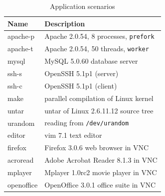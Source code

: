 \begin{table}[t]
\begin{center}
\small
\begin{tabular}{|l|l|}   \hline
\bf{Name}  & \bf{Description}                           \\ \hline
apache-p   & Apache 2.0.54, 8 processes, {\tt prefork}  \\ \hline
apache-t   & Apache 2.0.54, 50 threads, {\tt worker}    \\ \hline
mysql      & MySQL 5.0.60 database server               \\ \hline
ssh-s      & OpenSSH 5.1p1 (server)                     \\ \hline
ssh-c      & OpenSSH 5.1p1 (client)                     \\ \hline
make       & parallel compilation of Linux kernel       \\ \hline
untar      & untar of Linux 2.6.11.12 source tree       \\ \hline
urandom    & reading from {\tt /dev/urandom}            \\ \hline
editor     & vim 7.1 text editor                        \\ \hline
firefox    & Firefox 3.0.6 web browser in VNC           \\ \hline
acroread   & Adobe Acrobat Reader 8.1.3 in VNC          \\ \hline
mplayer    & Mplayer 1.0rc2 movie player in VNC         \\ \hline
openoffice & OpenOffice 3.0.1 office suite in VNC       \\ \hline
\end{tabular}
\caption{Application scenarios}
\label{scribe:tab:scenarios1}
\end{center}
\end{table}

